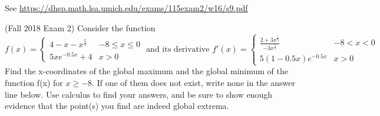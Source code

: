 \documentclass[11pt]{exam}
\begin{document}
\begin{questions}
  \begin{solution}
    See \href{https://dhsp.math.lsa.umich.edu/exams/115exam2/w16/s9.pdf}{https://dhsp.math.lsa.umich.edu/exams/115exam2/w16/s9.pdf}
  \end{solution}
\question (Fall 2018 Exam 2) Consider the function \[
    f(x) =
    \begin{cases}
      4-x-x^{\frac{2}{3}} & -8 \leq x \leq 0\\
      5xe^{-0.5x} + 4 & x > 0
    \end{cases}
    \text{ and its derivative }
    f'(x) =
    \begin{cases}
      \frac{2+3x^{\frac{1}{3}}}{-3x^{\frac{1}{3}}}  & -8 < x < 0 \\
      5(1-0.5x) e^{-0.5x} & x > 0
    \end{cases}
  \]
Find the x-coordinates of the global maximum and the global minimum of the function f(x) for \(x \geq -8\). If
one of them does not exist, write none in the answer line below. Use calculus to find your answers, and be
sure to show enough evidence that the point(s) you find are indeed global extrema.
\pagebreak

\end{questions}
\end{document}
